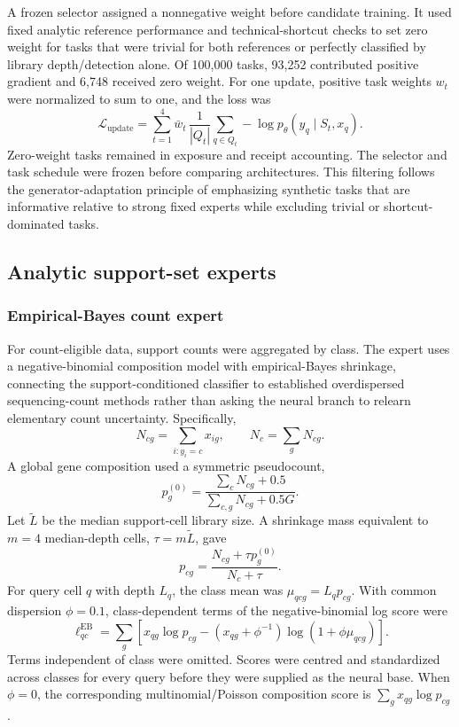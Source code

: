 \documentclass[12pt]{article}
\begin{document}
A frozen selector assigned a nonnegative weight before candidate training. It used fixed analytic reference performance and technical-shortcut checks to set zero weight for tasks that were trivial for both references or perfectly classified by library depth/detection alone. Of 100,000 tasks, 93,252 contributed positive gradient and 6,748 received zero weight. For one update, positive task weights $w_t$ were normalized to sum to one, and the loss was
\begin{equation}
\mathcal{L}_{\mathrm{update}}=\sum_{t=1}^{4}\bar w_t\,\frac{1}{|Q_t|}\sum_{q\in Q_t}-\log p_\theta(y_q\mid S_t,x_q).
\end{equation}
Zero-weight tasks remained in exposure and receipt accounting. The selector and task schedule were frozen before comparing architectures. This filtering follows the generator-adaptation principle of emphasizing synthetic tasks that are informative relative to strong fixed experts while excluding trivial or shortcut-dominated tasks\cite{rtfm2025}.

\subsection*{Analytic support-set experts}

\subsubsection*{Empirical-Bayes count expert}

For count-eligible data, support counts were aggregated by class. The expert uses a negative-binomial composition model with empirical-Bayes shrinkage, connecting the support-conditioned classifier to established overdispersed sequencing-count methods rather than asking the neural branch to relearn elementary count uncertainty\cite{robinson2010edger,lopez2018scvi,hafemeister2019sctransform}. Specifically,
\begin{equation}
N_{cg}=\sum_{i:y_i=c}x_{ig},\qquad N_c=\sum_gN_{cg}.
\end{equation}
A global gene composition used a symmetric pseudocount,
\begin{equation}
p^{(0)}_g=\frac{\sum_cN_{cg}+0.5}{\sum_{c,g}N_{cg}+0.5G}.
\end{equation}
Let $\tilde L$ be the median support-cell library size. A shrinkage mass equivalent to $m=4$ median-depth cells, $\tau=m\tilde L$, gave
\begin{equation}
p_{cg}=\frac{N_{cg}+\tau p^{(0)}_g}{N_c+\tau}.
\end{equation}
For query cell $q$ with depth $L_q$, the class mean was $\mu_{qcg}=L_qp_{cg}$. With common dispersion $\phi=0.1$, class-dependent terms of the negative-binomial log score were
\begin{equation}
\ell^{\mathrm{EB}}_{qc}=\sum_g\left[x_{qg}\log p_{cg}-\left(x_{qg}+\phi^{-1}\right)\log\left(1+\phi\mu_{qcg}\right)\right].
\end{equation}
Terms independent of class were omitted. Scores were centred and standardized across classes for every query before they were supplied as the neural base. When $\phi=0$, the corresponding multinomial/Poisson composition score is $\sum_gx_{qg}\log p_{cg}$.
\end{document}
